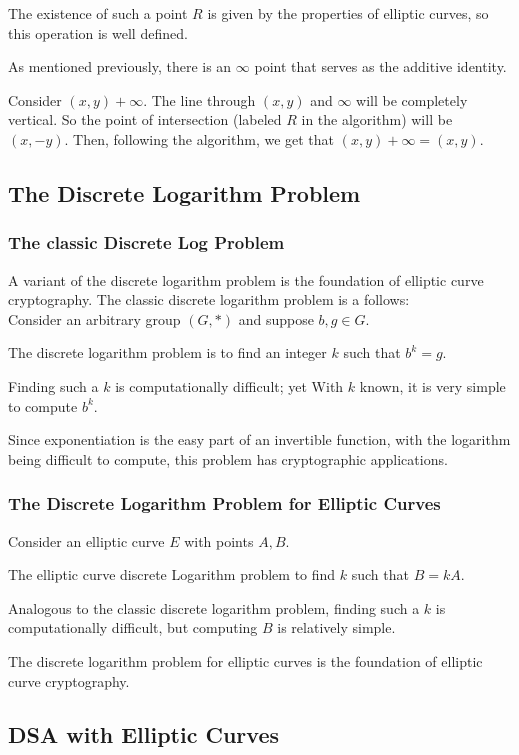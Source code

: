 The existence of such a point $R$ is given by the properties of elliptic curves,
so this operation is well defined.

As mentioned previously, there is an $\infty$ point that serves as the additive identity.

Consider $(x,y) + \infty$.
The line through $(x,y)$ and $\infty$ will be completely vertical.
So the point of intersection (labeled $R$ in the algorithm) will be $(x,-y)$.
Then, following the algorithm, we get that $(x,y) + \infty = (x,y)$.




\subsection{The Discrete Logarithm Problem}

\subsubsection{The classic Discrete Log Problem}
A variant of the discrete logarithm problem is the foundation of elliptic
curve cryptography.  The classic discrete logarithm problem is a follows:\\

Consider an arbitrary group $(G, *)$ and suppose $b,g \in G$.

The discrete logarithm problem is to find an integer $k$
such that $b^k = g$.

Finding such a $k$ is computationally difficult; yet
With $k$ known, it is very simple to compute $b^k$.

Since exponentiation is the easy part of an invertible function, with
the logarithm being difficult to compute, this problem has cryptographic
applications.


\subsubsection{The Discrete Logarithm Problem for Elliptic Curves}

Consider an elliptic curve $E$ with points $A,B$.

The elliptic curve discrete Logarithm problem to find $k$
such that $B = kA$.

Analogous to the classic discrete logarithm problem, finding such a $k$
is computationally difficult, but computing $B$ is relatively simple.

The discrete logarithm problem for elliptic curves is the foundation of
elliptic curve cryptography.



\subsection{DSA with Elliptic Curves}












